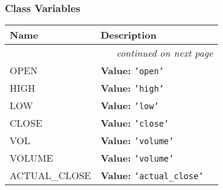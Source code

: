 
  \subsubsection{Class Variables}

    \vspace{-1cm}
\hspace{\varindent}\begin{longtable}{|p{\varnamewidth}|p{\vardescrwidth}|l}
\cline{1-2}
\cline{1-2} \centering \textbf{Name} & \centering \textbf{Description}& \\
\cline{1-2}
\endhead\cline{1-2}\multicolumn{3}{r}{\small\textit{continued on next page}}\\\endfoot\cline{1-2}
\endlastfoot\raggedright O\-P\-E\-N\- & \raggedright \textbf{Value:} 
{\tt \texttt{'}\texttt{open}\texttt{'}}&\\
\cline{1-2}
\raggedright H\-I\-G\-H\- & \raggedright \textbf{Value:} 
{\tt \texttt{'}\texttt{high}\texttt{'}}&\\
\cline{1-2}
\raggedright L\-O\-W\- & \raggedright \textbf{Value:} 
{\tt \texttt{'}\texttt{low}\texttt{'}}&\\
\cline{1-2}
\raggedright C\-L\-O\-S\-E\- & \raggedright \textbf{Value:} 
{\tt \texttt{'}\texttt{close}\texttt{'}}&\\
\cline{1-2}
\raggedright V\-O\-L\- & \raggedright \textbf{Value:} 
{\tt \texttt{'}\texttt{volume}\texttt{'}}&\\
\cline{1-2}
\raggedright V\-O\-L\-U\-M\-E\- & \raggedright \textbf{Value:} 
{\tt \texttt{'}\texttt{volume}\texttt{'}}&\\
\cline{1-2}
\raggedright A\-C\-T\-U\-A\-L\-\_\-C\-L\-O\-S\-E\- & \raggedright \textbf{Value:} 
{\tt \texttt{'}\texttt{actual\_close}\texttt{'}}&\\
\cline{1-2}
\end{longtable}



